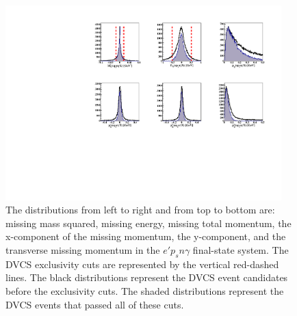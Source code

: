 \begin{figure}[htb]
  \centering
    \includegraphics[width=0.95\textwidth,clip]{figs_epngamma/pdf/epngamma_all_incoh_exc_cuts.pdf}
  \caption{
    The distributions from left to right and from top to bottom are:
    missing mass squared, missing energy, missing total momentum, the 
    x-component of the missing momentum, the y-component, and the transverse 
    missing momentum in the $e'p_{s}n\gamma$ final-state system. The DVCS 
    exclusivity cuts are represented by the vertical red-dashed lines. The 
    black distributions represent the DVCS event candidates before the 
    exclusivity cuts. The shaded distributions represent the DVCS events that 
    passed all of these cuts.
   \label{fig:fully_exclusive}}
\end{figure}


